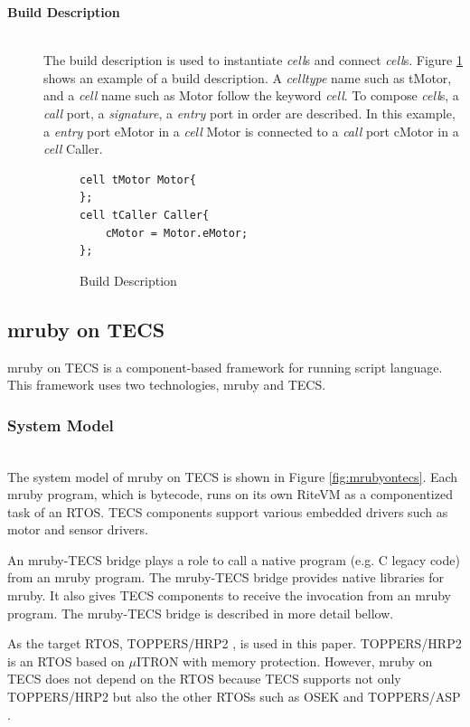 \documentclass[submit]{ipsj_v2/UTF8/ipsj}
\begin{document}
\begin{description}
    \item[{\bf Build Description}]\mbox{}\\
        The build description is used to instantiate {\it cell}s and connect {\it cell}s.
        Figure \ref{build} shows an example of a build description.
        A {\it celltype} name such as tMotor, and a {\it cell} name such as Motor follow the keyword {\it cell}.
        To compose {\it cell}s, a {\it call} port, a {\it signature}, a {\it entry} port in order are described.
        In this example, a {\it entry} port eMotor in a {\it cell} Motor is connected to a {\it call} port cMotor in a {\it cell} Caller.\\
\begin{figure}[t]
\centering
\begin{lstlisting}
cell tMotor Motor{
};
cell tCaller Caller{
    cMotor = Motor.eMotor;
};
\end{lstlisting}
\caption{Build Description}
\label{build}
\end{figure}

\end{description}

\subsection{mruby on TECS}
\label{sec:mruby on TECS}
mruby on TECS is a component-based framework for running script language.
This framework uses two technologies, mruby and TECS.

\subsubsection{System Model}\mbox{}\\

The system model of mruby on TECS is shown in Figure \ref{fig:mrubyontecs}.
Each mruby program, which is bytecode, runs on its own RiteVM as a componentized task of an RTOS.
TECS components support various embedded drivers such as motor and sensor drivers.

An mruby-TECS bridge plays a role to call a native program (e.g. C legacy code) from an mruby program.
The mruby-TECS bridge provides native libraries for mruby.
It also gives TECS components to receive the invocation from an mruby program.
The mruby-TECS bridge is described in more detail bellow.

As the target RTOS, TOPPERS/HRP2 \cite{url:HRP2}, \cite{par:hr-tecs} is used in this paper.
TOPPERS/HRP2 is an RTOS based on $\mu$ITRON \cite{par:microITRON} with memory protection.
However, mruby on TECS does not depend on the RTOS because TECS supports not only TOPPERS/HRP2 but also the other RTOSs such as OSEK \cite{par:OSEK} and TOPPERS/ASP \cite{url:ASP}.
\end{document}
